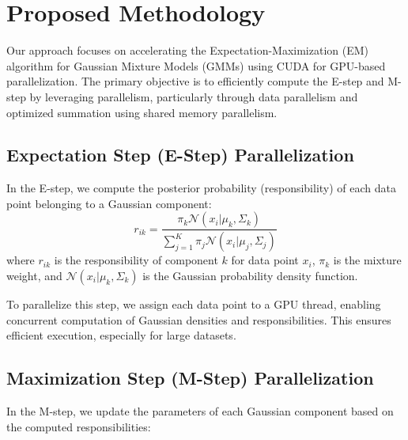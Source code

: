 \documentclass{article}
\begin{document}
\section{Proposed Methodology}
Our approach focuses on accelerating the Expectation-Maximization (EM) algorithm for Gaussian Mixture Models (GMMs) using CUDA for GPU-based parallelization. The primary objective is to efficiently compute the E-step and M-step by leveraging parallelism, particularly through data parallelism and optimized summation using shared memory parallelism.

\subsection{Expectation Step (E-Step) Parallelization}
In the E-step, we compute the posterior probability (responsibility) of each data point belonging to a Gaussian component:
\begin{equation}
    r_{ik} = \frac{\pi_k \mathcal{N}(x_i | \mu_k, \Sigma_k)}{\sum_{j=1}^{K} \pi_j \mathcal{N}(x_i | \mu_j, \Sigma_j)}
\end{equation}
where \( r_{ik} \) is the responsibility of component \( k \) for data point \( x_i \), \( \pi_k \) is the mixture weight, and \( \mathcal{N}(x_i | \mu_k, \Sigma_k) \) is the Gaussian probability density function.

To parallelize this step, we assign each data point to a GPU thread, enabling concurrent computation of Gaussian densities and responsibilities. This ensures efficient execution, especially for large datasets.

\subsection{Maximization Step (M-Step) Parallelization}

In the M-step, we update the parameters of each Gaussian component based on the computed responsibilities:
\end{document}
